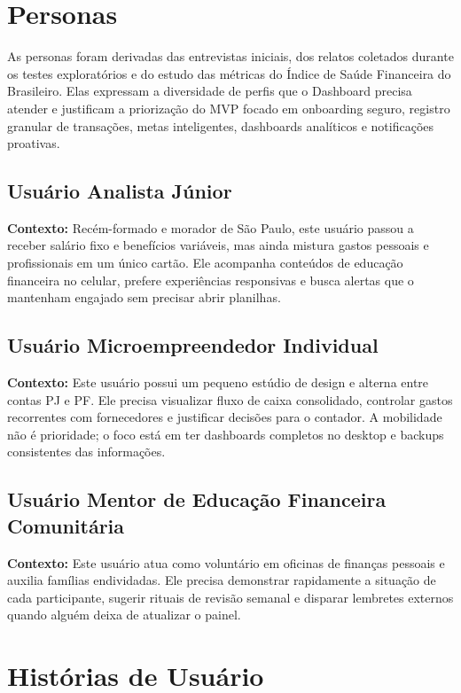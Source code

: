 \section{Personas}

As personas foram derivadas das entrevistas iniciais, dos relatos coletados durante os testes exploratórios e do estudo das métricas do Índice de Saúde Financeira do Brasileiro. Elas expressam a diversidade de perfis que o Dashboard precisa atender e justificam a priorização do MVP focado em onboarding seguro, registro granular de transações, metas inteligentes, dashboards analíticos e notificações proativas.

\subsection{Usuário Analista Júnior}
\textbf{Contexto:} Recém-formado e morador de São Paulo, este usuário passou a receber salário fixo e benefícios variáveis, mas ainda mistura gastos pessoais e profissionais em um único cartão. Ele acompanha conteúdos de educação financeira no celular, prefere experiências responsivas e busca alertas que o mantenham engajado sem precisar abrir planilhas.

\subsection{Usuário Microempreendedor Individual}
\textbf{Contexto:} Este usuário possui um pequeno estúdio de design e alterna entre contas PJ e PF. Ele precisa visualizar fluxo de caixa consolidado, controlar gastos recorrentes com fornecedores e justificar decisões para o contador. A mobilidade não é prioridade; o foco está em ter dashboards completos no desktop e backups consistentes das informações.

\subsection{Usuário Mentor de Educação Financeira Comunitária}
\textbf{Contexto:} Este usuário atua como voluntário em oficinas de finanças pessoais e auxilia famílias endividadas. Ele precisa demonstrar rapidamente a situação de cada participante, sugerir rituais de revisão semanal e disparar lembretes externos quando alguém deixa de atualizar o painel.

\section{Histórias de Usuário}
\label{sec:user-stories}

